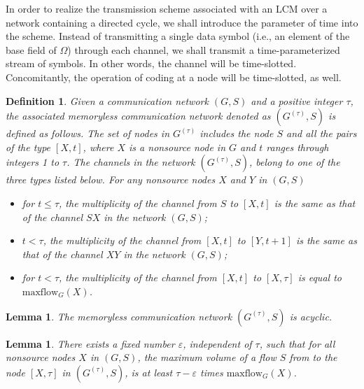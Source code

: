 \documentclass[journal]{IEEEtran}
\newtheorem*{defi}{Definition}
\newtheorem{lemm}[prop]{Lemma}
\begin{document}
\par
In order to realize the transmission scheme associated with an LCM over a network containing a directed cycle, we shall introduce the parameter of time into the scheme. Instead of transmitting a single data symbol (i.e., an element of the base field of $\Omega$) through each channel, we shall transmit a time-parameterized stream of symbols. In other words, the channel will be time-slotted. Concomitantly, the operation of coding at a node will be time-slotted, as well.
\begin{defi}
	Given a communication network $(G,S)$ and a positive integer $\tau$, the associated memoryless communication network denoted as $(G^{(\tau)},S)$ is defined as follows. The set of nodes in $G^{(\tau)}$ includes the node $S$ and all the pairs of the type $[X,t]$, where $X$ is a nonsource node in $G$ and $t$ ranges through integers 1 to $\tau$. The channels in the network $(G^{(\tau)},S)$, belong to one of the three types listed below. For any nonsource nodes $X$ and $Y$ in $(G,S)$
	\begin{itemize}
		\item[1)] for $t\leq \tau$, the multiplicity of the channel from $S$ to $[X,t]$ is the same as that of the channel $SX$ in the network $(G,S)$;
		\item[2)] $t<\tau$, the multiplicity of the channel from $[X,t]$ to $[Y,t+1]$ is the same as that of the channel $XY$ in the network $(G,S)$;
		\item[3)] for $t<\tau$, the multiplicity of the channel from $[X,t]$ to $[X,\tau]$ is equal to $\text{maxflow}_G(X)$.
	\end{itemize}
\end{defi}


\begin{lemm}
	The memoryless communication network $(G^{(\tau)},S)$ is acyclic.
\end{lemm}


\begin{lemm}
	There exists a fixed number $\varepsilon$, independent of $\tau$, such that for all nonsource nodes $X$ in $(G,S)$, the maximum volume of a flow $S$ from to the node $[X,\tau]$ in $(G^{(\tau)},S)$, is at least $\tau-\varepsilon$ times $\text{maxflow}_G(X)$.
\end{lemm}
\end{document}
